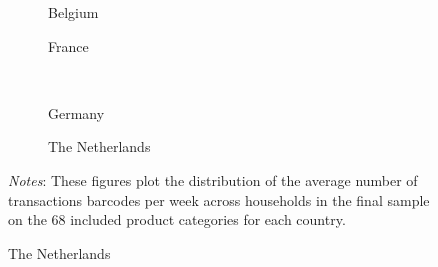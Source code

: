  \begin{figure}[H]
    \centering
    \caption{Purchases per week}
    \label{fig: app_data_households_trans_year}
    \begin{subfigure}[t]{.49\textwidth}
         \centering
         \caption{Belgium}
         \scalebox{0.45}{}
     \end{subfigure}
     \begin{subfigure}[t]{.49\textwidth}
         \centering
         \caption{France}
         \scalebox{0.45}{}
     \end{subfigure}\\
     \begin{subfigure}[t]{.49\textwidth}
         \centering
         \caption{Germany}
         \scalebox{0.45}{}
     \end{subfigure}
     \begin{subfigure}[t]{.49\textwidth}
         \centering
         \caption{The Netherlands}
         \scalebox{0.45}{}
     \end{subfigure}
     \parbox{\textwidth}{
        \begin{spacing}{1} 
            {\footnotesize 
            \textit{Notes}: These figures plot the distribution of the average number of transactions barcodes per week across households in the final sample on the 68 included product categories for each country.}
        \end{spacing}}
 \end{figure} 

